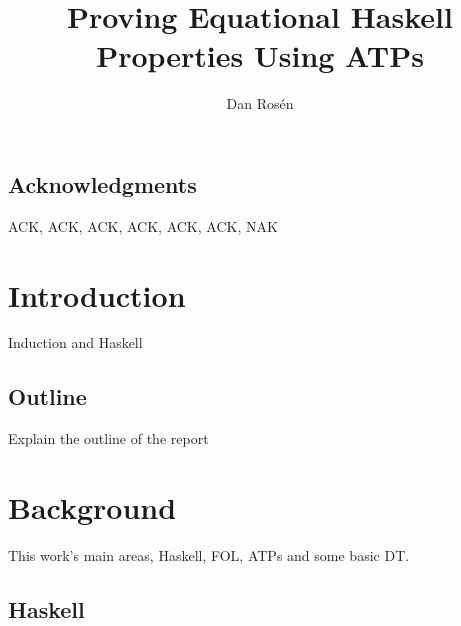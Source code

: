 \documentclass{report}
\begin{document}
\title{Proving Equational Haskell Properties Using ATPs}
\author{Dan Rosén}
\maketitle


\newpage
{}


\newpage
\pagestyle{empty}
\section*{Acknowledgments}
\vspace{5mm}
ACK, ACK, ACK, ACK, ACK, ACK, NAK


\newpage
\tableofcontents
{}

\newpage
\setcounter{page}{1}

\chapter{Introduction}

Induction and Haskell

\section{Outline}

Explain the outline of the report

\chapter{Background}

This work's main areas, Haskell, FOL, ATPs and some basic DT.

\section{Haskell}
\end{document}
